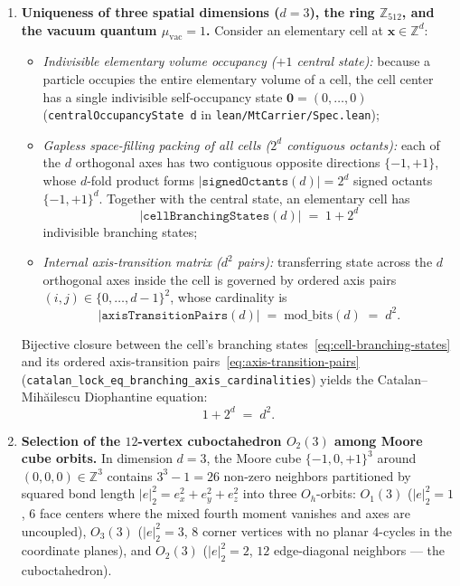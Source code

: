 \documentclass[11pt,a4paper]{article}
\theoremstyle{plain}
\theoremstyle{definition}
\begin{document}
\begin{enumerate}[label=\textbf{Step \arabic*.},leftmargin=*]
\item \textbf{Uniqueness of three spatial dimensions ($d = 3$), the ring $\mathbb{Z}_{512}$, and the vacuum quantum $\mu_{\mathrm{vac}} = 1$.}
  Consider an elementary cell at $\mathbf{x}\in\mathbb{Z}^d$:
  \begin{itemize}[leftmargin=*]
  \item \emph{Indivisible elementary volume occupancy ($+1$ central state):} because a particle occupies the entire elementary volume of a cell, the cell center has a single indivisible self-occupancy state $\mathbf{0} = (0,\dots,0)$ (\texttt{centralOccupancyState d} in \texttt{lean/MtCarrier/Spec.lean});
  \item \emph{Gapless space-filling packing of all cells ($2^d$ contiguous octants):} each of the $d$ orthogonal axes has two contiguous opposite directions $\{-1,+1\}$, whose $d$-fold product forms $|\texttt{signedOctants}(d)| = 2^d$ signed octants $\{-1,+1\}^d$. Together with the central state, an elementary cell has
    \begin{equation}
      \label{eq:cell-branching-states}
      |\texttt{cellBranchingStates}(d)| \;=\; 1 + 2^d
    \end{equation}
    indivisible branching states;
  \item \emph{Internal axis-transition matrix ($d^2$ pairs):} transferring state across the $d$ orthogonal axes inside the cell is governed by ordered axis pairs $(i,j)\in\{0,\dots,d-1\}^2$, whose cardinality is
    \begin{equation}
      \label{eq:axis-transition-pairs}
      |\texttt{axisTransitionPairs}(d)| \;=\; \mathrm{mod\_bits}(d) \;=\; d^2.
    \end{equation}
  \end{itemize}
  Bijective closure between the cell's branching states~\eqref{eq:cell-branching-states} and its ordered axis-transition pairs~\eqref{eq:axis-transition-pairs} (\texttt{catalan\_lock\_eq\_branching\_axis\_cardinalities}) yields the Catalan--Mih\u{a}ilescu Diophantine equation:
  \begin{equation}
    \label{eq:catalan-lock}
    1 + 2^d \;=\; d^2.
  \end{equation}

\item \textbf{Selection of the $12$-vertex cuboctahedron $O_2(3)$ among Moore cube orbits.}
  In dimension $d = 3$, the Moore cube $\{-1,0,+1\}^3$ around $(0,0,0)\in\mathbb{Z}^3$ contains $3^3 - 1 = 26$ non-zero neighbors partitioned by squared bond length $|e|_2^2 = e_x^2 + e_y^2 + e_z^2$ into three $O_h$-orbits: $O_1(3)$ ($|e|_2^2 = 1$, $6$ face centers where the mixed fourth moment vanishes and axes are uncoupled), $O_3(3)$ ($|e|_2^2 = 3$, $8$ corner vertices with no planar $4$-cycles in the coordinate planes), and $O_2(3)$ ($|e|_2^2 = 2$, $12$ edge-diagonal neighbors --- the cuboctahedron).


\end{enumerate}
\end{document}
